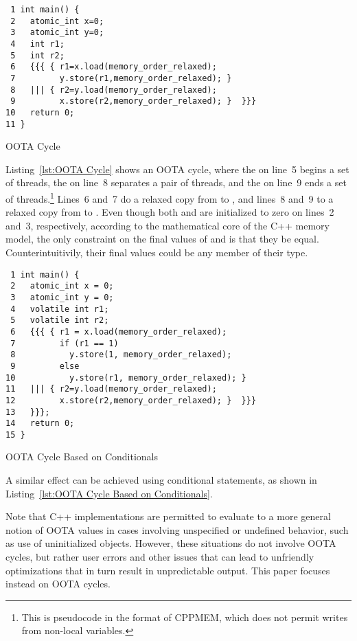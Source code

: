 \documentclass[10]{article}
\begin{document}
\begin{listing}[tbp]
\begin{verbatim}
 1 int main() {
 2   atomic_int x=0;
 3   atomic_int y=0;
 4   int r1;
 5   int r2;
 6   {{{ { r1=x.load(memory_order_relaxed);
 7         y.store(r1,memory_order_relaxed); }
 8   ||| { r2=y.load(memory_order_relaxed);
 9         x.store(r2,memory_order_relaxed); }  }}}
10   return 0;
11 }
\end{verbatim}
\caption{OOTA Cycle}
\label{lst:OOTA Cycle}
\end{listing}

Listing~\ref{lst:OOTA Cycle}
shows an OOTA cycle, where the \co{\{\{\{} on line~5 begins a set of
threads, the \co{|||} on line~8 separates a pair of threads, and
the \co{\}\}\}} on line~9 ends a set of threads.\footnote{
	This is pseudocode in the format of CPPMEM,
	which does not permit writes from non-local variables.}
Lines~6 and~7 do a relaxed copy from  to , and
lines~8 and~9 to a relaxed copy from  to .
Even though both  and  are initialized to zero on
lines~2 and~3, respectively, according to the mathematical core
of the C++ memory model, the only constraint on the final values
of  and  is that they be equal.
Counterintuitivily, their final values could be any member of their type.

\begin{listing}[tbp]
\begin{verbatim}
 1 int main() {
 2   atomic_int x = 0;
 3   atomic_int y = 0;
 4   volatile int r1;
 5   volatile int r2;
 6   {{{ { r1 = x.load(memory_order_relaxed);
 7         if (r1 == 1)
 8           y.store(1, memory_order_relaxed);
 9         else
10           y.store(r1, memory_order_relaxed); }
11   ||| { r2=y.load(memory_order_relaxed);
12         x.store(r2,memory_order_relaxed); }  }}}
13   }}};
14   return 0;
15 }
\end{verbatim}
\caption{OOTA Cycle Based on Conditionals}
\label{lst:OOTA Cycle Based on Conditionals}
\end{listing}

A similar effect can be achieved using conditional statements, as
shown in Listing~\ref{lst:OOTA Cycle Based on Conditionals}.

Note that C++ implementations are permitted to evaluate to a more
general notion of OOTA values in cases involving unspecified or undefined
behavior, such as use of uninitialized objects.
However, these situations do not involve OOTA cycles, but rather user
errors and other issues that can lead to unfriendly optimizations that
in turn result in unpredictable output.
This paper focuses instead on OOTA cycles.
\end{document}
